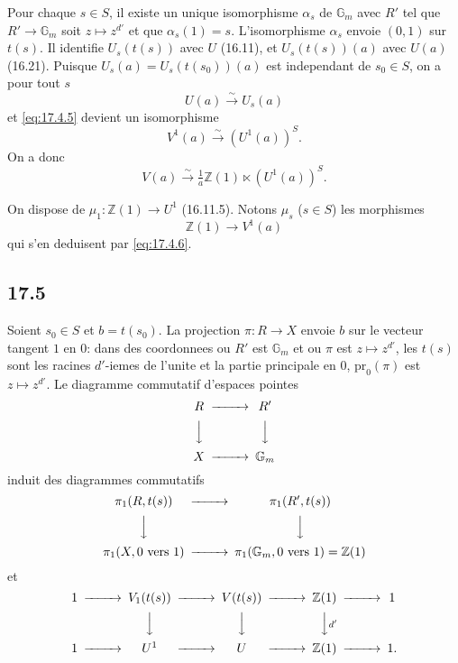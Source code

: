 \documentclass[12pt,a4paper]{article}
\theoremstyle{plain}
\theoremstyle{definition}
\theoremstyle{remark}
\newcommand{\Gm}{\mathbb{G}_m}
\newcommand{\ZZ}{\mathbb{Z}}
\begin{document}
Pour chaque $s \in S$, il existe un unique isomorphisme $\alpha_s$ de
$\Gm$ avec $R'$ tel que $R' \to \Gm$ soit $z \mapsto z^{d'}$ et que
$\alpha_s(1) = s$. L'isomorphisme $\alpha_s$ envoie $(0,1)$ sur
$t(s)$. Il identifie $U_s(t(s))$ avec $U$ (16.11), et
$U_s(t(s))(a)$ avec $U(a)$ (16.21). Puisque
$U_s(a) = U_s(t(s_0))(a)$ est independant de $s_0 \in S$, on a pour
tout $s$
\[
U(a) \xrightarrow{\sim} U_s(a)
\]
et \eqref{eq:17.4.5} devient un isomorphisme
\begin{equation}\label{eq:17.4.6}
V^1(a) \xrightarrow{\sim} (U^1(a))^S.
\end{equation}
On a donc
\begin{equation}\label{eq:17.4.7}
V(a) \xrightarrow{\sim} \tfrac{1}{a}\ZZ(1) \ltimes (U^1(a))^S.
\end{equation}

On dispose de $\mu_1 : \ZZ(1) \to U^1$ (16.11.5). Notons $\mu_s$
($s \in S$) les morphismes
\begin{equation}\label{eq:17.4.8}
\ZZ(1) \to V^1(a)
\end{equation}
qui s'en deduisent par \eqref{eq:17.4.6}.

\subsection{17.5}

Soient $s_0 \in S$ et $b = t(s_0)$. La projection $\pi : R \to X$
envoie $b$ sur le vecteur tangent $1$ en $0$: dans des coordonnees ou
$R'$ est $\Gm$ et ou $\pi$ est $z \mapsto z^{d'}$, les $t(s)$ sont les
racines $d'$-iemes de l'unite et la partie principale en $0$,
$\mathrm{pr}_0(\pi)$ est $z \mapsto z^{d'}$. Le diagramme commutatif
d'espaces pointes
\[
\begin{CD}
R @>>> R' \\
@VVV @VVV \\
X @>>> \Gm
\end{CD}
\]
induit des diagrammes commutatifs
\[
\begin{CD}
\pi_1(R,t(s)) @>>> \pi_1(R',t(s)) \\
@VVV @VVV \\
\pi_1(X,0 \text{ vers } 1) @>>> \pi_1(\Gm, 0 \text{ vers } 1) = \ZZ(1)
\end{CD}
\]
et
\[
\begin{CD}
1 @>>> V_1(t(s)) @>>> V(t(s)) @>>> \ZZ(1) @>>> 1 \\
@. @VVV @VVV @VV{d'}V \\
1 @>>> U^1 @>>> U @>>> \ZZ(1) @>>> 1.
\end{CD}
\]
\end{document}
